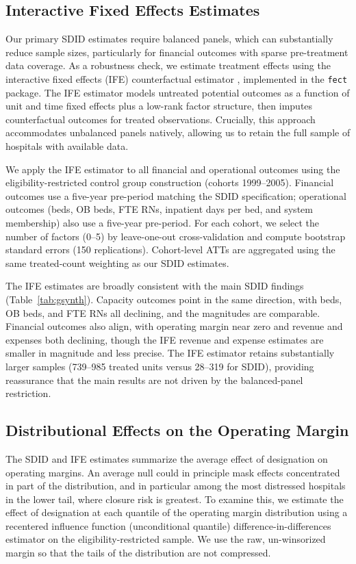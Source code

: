 \documentclass[a4paper, 12pt]{article}
\begin{document}
\subsection{Interactive Fixed Effects Estimates}

Our primary SDID estimates require balanced panels, which can substantially reduce sample sizes, particularly for financial outcomes with sparse pre-treatment data coverage. As a robustness check, we estimate treatment effects using the interactive fixed effects (IFE) counterfactual estimator \citep{xu2017}, implemented in the \texttt{fect} package. The IFE estimator models untreated potential outcomes as a function of unit and time fixed effects plus a low-rank factor structure, then imputes counterfactual outcomes for treated observations. Crucially, this approach accommodates unbalanced panels natively, allowing us to retain the full sample of hospitals with available data.

We apply the IFE estimator to all financial and operational outcomes using the eligibility-restricted control group construction (cohorts 1999--2005). Financial outcomes use a five-year pre-period matching the SDID specification; operational outcomes (beds, OB beds, FTE RNs, inpatient days per bed, and system membership) also use a five-year pre-period. For each cohort, we select the number of factors (0--5) by leave-one-out cross-validation and compute bootstrap standard errors (150 replications). Cohort-level ATTs are aggregated using the same treated-count weighting as our SDID estimates.

The IFE estimates are broadly consistent with the main SDID findings (Table~\ref{tab:gsynth}). Capacity outcomes point in the same direction, with beds, OB beds, and FTE RNs all declining, and the magnitudes are comparable. Financial outcomes also align, with operating margin near zero and revenue and expenses both declining, though the IFE revenue and expense estimates are smaller in magnitude and less precise. The IFE estimator retains substantially larger samples (739--985 treated units versus 28--319 for SDID), providing reassurance that the main results are not driven by the balanced-panel restriction.

\subsection{Distributional Effects on the Operating Margin}
\label{sec:app-quantile}

The SDID and IFE estimates summarize the average effect of designation on operating margins. An average null could in principle mask effects concentrated in part of the distribution, and in particular among the most distressed hospitals in the lower tail, where closure risk is greatest. To examine this, we estimate the effect of designation at each quantile of the operating margin distribution using a recentered influence function (unconditional quantile) difference-in-differences estimator on the eligibility-restricted sample. We use the raw, un-winsorized margin so that the tails of the distribution are not compressed.
\end{document}
